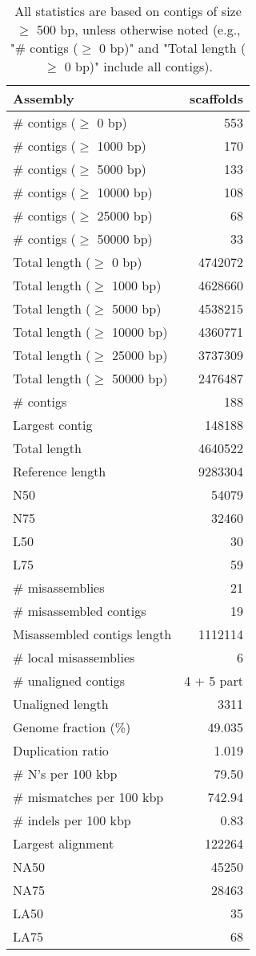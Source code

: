 \documentclass[12pt,a4paper]{article}
\begin{document}
\begin{table}[ht]
\begin{center}
\caption{All statistics are based on contigs of size $\geq$ 500 bp, unless otherwise noted (e.g., "\# contigs ($\geq$ 0 bp)" and "Total length ($\geq$ 0 bp)" include all contigs).}
\begin{tabular}{|l*{1}{|r}|}
\hline
Assembly & scaffolds \\ \hline
\# contigs ($\geq$ 0 bp) & 553 \\ \hline
\# contigs ($\geq$ 1000 bp) & 170 \\ \hline
\# contigs ($\geq$ 5000 bp) & 133 \\ \hline
\# contigs ($\geq$ 10000 bp) & 108 \\ \hline
\# contigs ($\geq$ 25000 bp) & 68 \\ \hline
\# contigs ($\geq$ 50000 bp) & 33 \\ \hline
Total length ($\geq$ 0 bp) & 4742072 \\ \hline
Total length ($\geq$ 1000 bp) & 4628660 \\ \hline
Total length ($\geq$ 5000 bp) & 4538215 \\ \hline
Total length ($\geq$ 10000 bp) & 4360771 \\ \hline
Total length ($\geq$ 25000 bp) & 3737309 \\ \hline
Total length ($\geq$ 50000 bp) & 2476487 \\ \hline
\# contigs & 188 \\ \hline
Largest contig & 148188 \\ \hline
Total length & 4640522 \\ \hline
Reference length & 9283304 \\ \hline
N50 & 54079 \\ \hline
N75 & 32460 \\ \hline
L50 & 30 \\ \hline
L75 & 59 \\ \hline
\# misassemblies & 21 \\ \hline
\# misassembled contigs & 19 \\ \hline
Misassembled contigs length & 1112114 \\ \hline
\# local misassemblies & 6 \\ \hline
\# unaligned contigs & 4 + 5 part \\ \hline
Unaligned length & 3311 \\ \hline
Genome fraction (\%) & 49.035 \\ \hline
Duplication ratio & 1.019 \\ \hline
\# N's per 100 kbp & 79.50 \\ \hline
\# mismatches per 100 kbp & 742.94 \\ \hline
\# indels per 100 kbp & 0.83 \\ \hline
Largest alignment & 122264 \\ \hline
NA50 & 45250 \\ \hline
NA75 & 28463 \\ \hline
LA50 & 35 \\ \hline
LA75 & 68 \\ \hline
\end{tabular}
\end{center}
\end{table}
\end{document}
